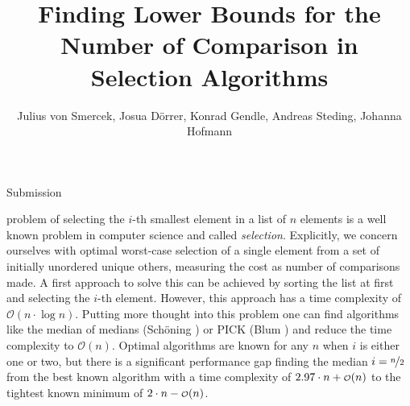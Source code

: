 \documentclass[10pt,journal,compsoc]{IEEEtran}
\newcommand\smallO{
  \mathchoice
    {{\scriptstyle\mathcal{O}}}%
    {{\scriptstyle\mathcal{O}}}%
    {{\scriptscriptstyle\mathcal{O}}}%
    {\scalebox{.50}{$\scriptscriptstyle\mathcal{O}$}}%
  }
\begin{document}
\title{Finding Lower Bounds for the Number of Comparison in Selection Algorithms}

\author{Julius von Smercek, Josua Dörrer, Konrad Gendle, Andreas Steding, Johanna Hofmann%
  }

%
{Submission}



\maketitle

\IEEEdisplaynontitleabstractindextext


\IEEEpeerreviewmaketitle

  problem of selecting the $i$-th smallest element in a list of $n$ elements is
a well known problem in computer science and called \textit{selection}. Explicitly, we
concern ourselves with optimal worst-case selection of a single element from a set of
initially unordered unique others, measuring the cost as number of comparisons made.
A first approach to solve
this can be achieved by sorting the list at first and selecting the $i$-th element. However, this
approach has a time complexity of $\mathcal{O}(n \cdot \log n)$. Putting more thought into this
problem one can find algorithms like the median of medians (Schöning \cite{Schoening1993}) or PICK
(Blum \cite{Blum1972}) and reduce the time complexity to $\mathcal{O}(n)$. Optimal algorithms are
known for any $n$ when $i$ is either one or two, but there is a significant performance gap finding
the median $i = \nicefrac{n}{2}$ from the best known algorithm with a time complexity of $2.97 \cdot
  n + \smallO(n)$ to the tightest known minimum of $2 \cdot n - \smallO(n)$.
\end{document}
